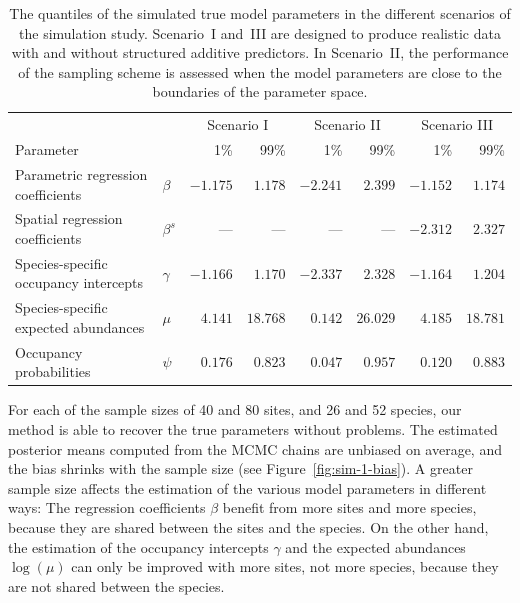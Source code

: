 \documentclass{article}
\begin{document}
\begin{table}
\centering
\caption{The quantiles of the simulated true model parameters in the different scenarios of the simulation study. Scenario~I and~III are designed to produce realistic data with and without structured additive predictors. In Scenario~II, the performance of the sampling scheme is assessed when the model parameters are close to the boundaries of the parameter space.}
\label{tab:sim-truth}
\begin{tabular}{llrrrrrr}
\toprule
                                      &           & \multicolumn{2}{c}{Scenario I} & \multicolumn{2}{c}{Scenario II} & \multicolumn{2}{c}{Scenario III} \\
                                                    \cmidrule(lr){3-4}               \cmidrule(lr){5-6}                \cmidrule(lr){7-8}
Parameter                             &           &      1\% &     99\%            &      1\% &     99\%             &      1\% &     99\% \\
\midrule
Parametric regression coefficients    & $\beta$   & $-1.175$ &  $1.178$            & $-2.241$ &  $2.399$             & $-1.152$ &  $1.174$ \\
Spatial regression coefficients       & $\beta^s$ &      --- &      ---            &      --- &      ---             & $-2.312$ &  $2.327$ \\
Species-specific occupancy intercepts & $\gamma$  & $-1.166$ &  $1.170$            & $-2.337$ &  $2.328$             & $-1.164$ &  $1.204$ \\
Species-specific expected abundances  & $\mu$     &  $4.141$ & $18.768$            &  $0.142$ & $26.029$             &  $4.185$ & $18.781$ \\
Occupancy probabilities               & $\psi$    &  $0.176$ &  $0.823$            &  $0.047$ &  $0.957$             &  $0.120$ &  $0.883$ \\
\bottomrule
\end{tabular}
\end{table}

For each of the sample sizes of 40 and 80 sites, and 26 and 52 species, our method is able to recover the true parameters without problems. The estimated posterior means computed from the MCMC chains are unbiased on average, and the bias shrinks with the sample size (see Figure~\ref{fig:sim-1-bias}). A greater sample size affects the estimation of the various model parameters in different ways: The regression coefficients $\beta$ benefit from more sites and more species, because they are shared between the sites and the species. On the other hand, the estimation of the occupancy intercepts $\gamma$ and the expected abundances $\log(\mu)$ can only be improved with more sites, not more species, because they are not shared between the species.
\end{document}
